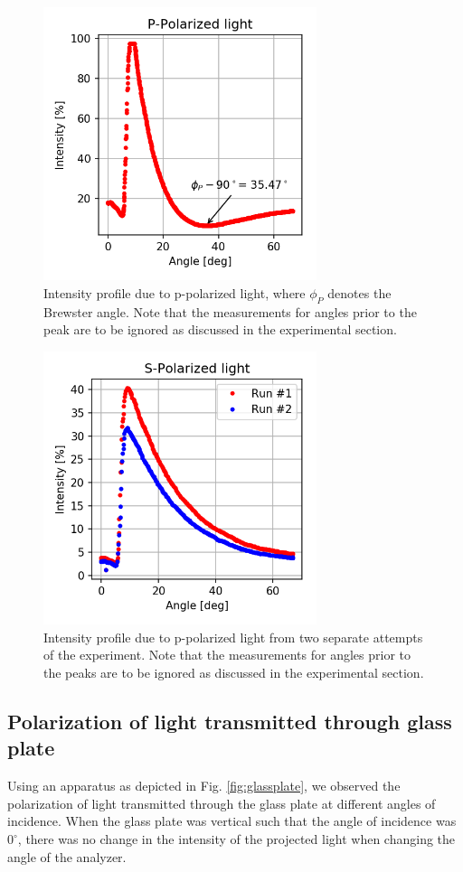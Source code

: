 \documentclass[%
 reprint,
 amsmath,amssymb,
 aps,
]{revtex4-1}
\begin{document}
  \begin{figure}[h!]
    \center
    \includegraphics[width=8cm]{scripts/ppolar.png}
    \caption{Intensity profile due to p-polarized light, where $\phi_P$ denotes the Brewster angle. Note that the measurements for angles prior to the peak are to be ignored as discussed in the experimental section.}
    \label{fig:ppolar}
  \end{figure}

  \begin{figure}[h!]
    \center
    \includegraphics[width=8cm]{scripts/spolar.png}
    \caption{Intensity profile due to p-polarized light from two separate attempts of the experiment. Note that the measurements for angles prior to the peaks are to be ignored as discussed in the experimental section.}
    \label{fig:spolar}
  \end{figure}

  \subsection{Polarization of light transmitted through glass plate}
    Using an apparatus as depicted in Fig. \ref{fig:glassplate}, we observed the polarization of light transmitted through the glass plate at different angles of incidence. When the glass plate was vertical such that the angle of incidence was $0^\circ$, there was no change in the intensity of the projected light when changing the angle of the analyzer. 
\end{document}
